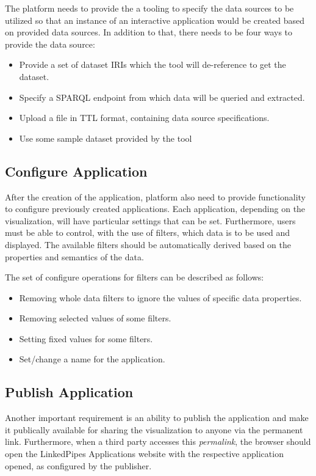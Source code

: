 The platform needs to provide the a tooling to specify the data sources to be utilized so that an instance of an interactive application would be created based on provided data sources. In addition to that, there needs to be four ways to provide the data source:

\begin{itemize}
\item Provide a set of dataset \acrshort{IRI}s which the tool will de-reference to get the dataset.
\item Specify a \acrshort{SPARQL} endpoint from which data will be queried and extracted.
\item Upload a file in \acrshort{TTL} format, containing data source specifications.
\item Use some sample dataset provided by the tool
\end{itemize}

\subsection{Configure Application}

After the creation of the application, platform also need to provide functionality to configure previously created applications. Each application, depending on the visualization, will have particular settings that can be set. Furthermore, users must be able to control, with the use of filters, which data is to be used and displayed. The available filters should be automatically derived based on the properties and semantics of the data. 

The set of configure operations for filters can be described as follows:

\begin{itemize}
\item Removing whole data filters to ignore the values of specific data properties.
\item Removing selected values of some filters.
\item Setting fixed values for some filters.
\item Set/change a name for the application.
\end{itemize}

\subsection{Publish Application}

Another important requirement is an ability to publish the application and make it publically available for sharing the visualization to anyone via the permanent link. Furthermore, when a third party accesses this \textit{permalink}, the browser should open the LinkedPipes Applications website with the respective application opened, as configured by the publisher.

